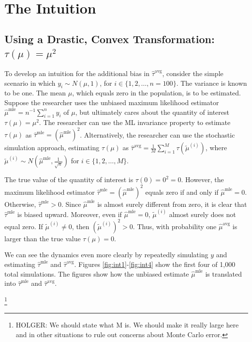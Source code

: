 \documentclass[11pt]{article}
\begin{document}
\section*{The Intuition}

\subsection*{Using a Drastic, Convex Transformation: $\tau(\mu) = \mu^2$}

To develop an intuition for the additional bias in $\hat{\tau}^\text{avg}$, consider the simple scenario in which $y_i \sim N(\mu, 1)$, for $i \in \{1, 2, \ldots, n = 100\}$. The variance is known to be one. The mean $\mu$, which equals zero in the population, is to be estimated. Suppose the researcher uses the unbiased maximum likelihood estimator $\hat{\mu}^\text{mle} = n^{-1}\sum_{i=1}^n y_i$ of $\mu$, but ultimately cares about the quantity of interest $\tau(\mu) = \mu^2$. The researcher can use the ML invariance property to estimate $\tau(\mu)$ as $\hat{\tau}^\text{mle} = \left( \hat{\mu}^\text{mle} \right) ^2$. Alternatively, the researcher can use the stochastic simulation approach, estimating $\tau(\mu)$ as $\hat{\tau}^\text{avg} = \frac{1}{M} \sum_{i = 1}^M \tau \left( \tilde{\mu}^{(i)} \right)$, where $\tilde{\mu}^{(i)} \sim N \left( \hat{\mu}^\text{mle}, \frac{1}{\sqrt{n}} \right)$ for $i \in \{1, 2,\ldots, M\}$.

The true value of the quantity of interest is $\tau(0) = 0^2 = 0$. However, the maximum likelihood estimator $\hat{\tau}^\text{mle} = \left( \hat{\mu}^\text{mle} \right)^2$ equals zero if and only if $\hat{\mu}^\text{mle} = 0$. Otherwise, $\hat{\tau}^\text{mle} > 0$.
Since $\hat{\mu}^\text{mle}$ is almost surely different from zero, it is clear that $\hat{\tau}^\text{mle}$ is biased upward. Moreover, even if $\hat{\mu}^\text{mle} = 0$, $\tilde{\mu}^{(i)}$ almost surely does not equal zero. If $\tilde{\mu}^{(i)} \neq 0$, then $\left( \tilde{\mu}^{(i)} \right)^2 > 0$. Thus, with probability one $\hat{\mu}^\text{avg}$ is larger than the true value $\tau(\mu) = 0$.

We can see the dynamics even more clearly by repeatedly simulating $y$ and estimating $\hat{\tau}^\text{mle}$ and $\hat{\tau}^\text{avg}$. Figures \ref{fig:int1}-\ref{fig:int4} show the first four of 1,000 total simulations. The figures show how the unbiased estimate $\hat{\mu}^\text{mle}$ is translated into $\hat{\tau}^\text{mle}$ and $\hat{\tau}^\text{avg}$.

\footnote{\color{red} HOLGER: We should state what M is. We should make it really large here and in other situations to rule out concerns about Monte Carlo error.}
\end{document}
